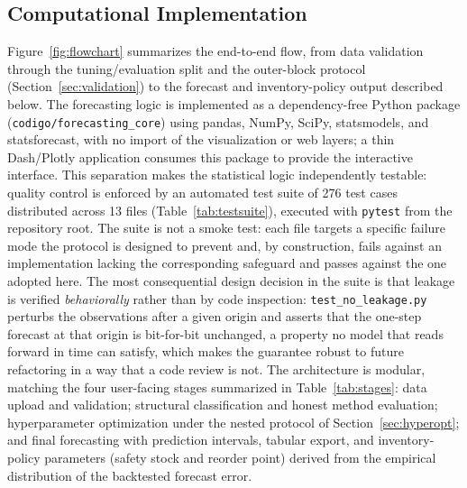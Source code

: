 \documentclass[forecasting,article,submit,pdftex,moreauthors]{Definitions/mdpi}
\begin{document}
\subsection{Computational Implementation}
\label{sec:implementation}

Figure~\ref{fig:flowchart} summarizes the end-to-end flow, from data validation through the tuning/evaluation split and the outer-block protocol (Section~\ref{sec:validation}) to the forecast and inventory-policy output described below. The forecasting logic is implemented as a dependency-free Python package (\texttt{codigo/\allowbreak forecasting\_\allowbreak core}) using pandas, NumPy, SciPy, statsmodels, and statsforecast, with no import of the visualization or web layers; a thin Dash/Plotly application consumes this package to provide the interactive interface. This separation makes the statistical logic independently testable: quality control is enforced by an automated test suite of 276 test cases distributed across 13 files (Table~\ref{tab:testsuite}), executed with \texttt{pytest} from the repository root. The suite is not a smoke test: each file targets a specific failure mode the protocol is designed to prevent and, by construction, fails against an implementation lacking the corresponding safeguard and passes against the one adopted here. The most consequential design decision in the suite is that leakage is verified \emph{behaviorally} rather than by code inspection: \texttt{test\_\allowbreak no\_\allowbreak leakage.py} perturbs the observations after a given origin and asserts that the one-step forecast at that origin is bit-for-bit unchanged, a property no model that reads forward in time can satisfy, which makes the guarantee robust to future refactoring in a way that a code review is not. The architecture is modular, matching the four user-facing stages summarized in Table~\ref{tab:stages}: data upload and validation; structural classification and honest method evaluation; hyperparameter optimization under the nested protocol of Section~\ref{sec:hyperopt}; and final forecasting with prediction intervals, tabular export, and inventory-policy parameters (safety stock and reorder point) derived from the empirical distribution of the backtested forecast error.
\end{document}
